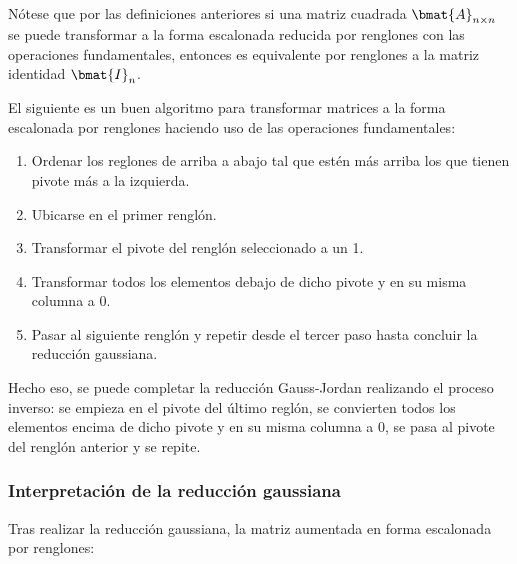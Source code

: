 \documentclass{fmbnotes}
\begin{document}
Nótese que por las definiciones anteriores si una matriz cuadrada \(\bmat{A}_{n \times n}\) se puede transformar a la forma escalonada reducida por renglones con las operaciones fundamentales, entonces es equivalente por renglones a la matriz identidad \(\bmat{I}_n\).

El siguiente es un buen algoritmo para transformar matrices a la forma escalonada por renglones haciendo uso de las operaciones fundamentales:
\begin{enumerate}[label=\arabic*\textdegree.]
	\item Ordenar los reglones de arriba a abajo tal que estén más arriba los que tienen pivote más a la izquierda. 
	\item Ubicarse en el primer renglón.
	\item Transformar el pivote del renglón seleccionado a un 1.
	\item Transformar todos los elementos debajo de dicho pivote y en su misma columna a 0.
	\item Pasar al siguiente renglón y repetir desde el tercer paso hasta concluir la reducción gaussiana.
\end{enumerate}
Hecho eso, se puede completar la reducción Gauss-Jordan realizando el proceso inverso: se empieza en el pivote del último reglón, se convierten todos los elementos encima de dicho pivote y en su misma columna a 0, se pasa al pivote del renglón anterior y se repite.

\subsubsection{Interpretación de la reducción gaussiana}

Tras realizar la reducción gaussiana, la matriz aumentada en forma escalonada por renglones:
\end{document}
